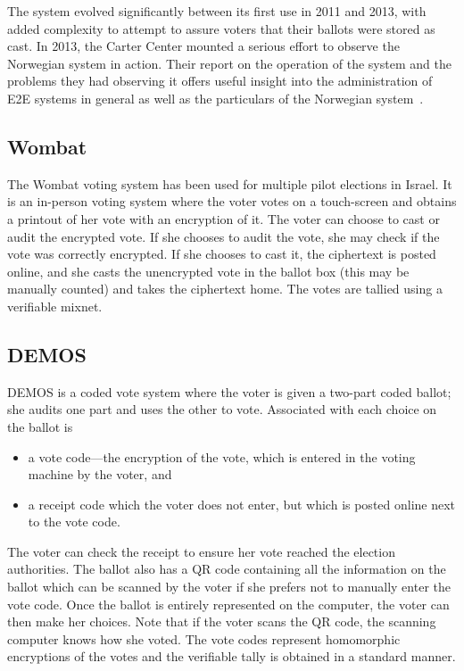 The system evolved significantly between its first use in 2011 and
2013, with added complexity to attempt to assure voters that their
ballots were stored as cast. In 2013, the Carter Center mounted a
serious effort to observe the Norwegian system in action. Their
report on the operation of the system and the problems
they had observing it offers useful insight into the administration of
E2E systems in general as well as the particulars of the Norwegian
system~\cite{carter2013}.

\subsection{Wombat~\cite{rosen2011}}

The Wombat voting system has been used for multiple pilot elections in
Israel. It is an in-person voting system where the voter votes on a
touch-screen and obtains a printout of her vote with an encryption of
it. The voter can choose to cast or audit the encrypted vote. If she
chooses to audit the vote, she may check if the vote was correctly
encrypted. If she chooses to cast it, the ciphertext is posted online,
and she casts the unencrypted vote in the ballot box (this may be
manually counted) and takes the ciphertext home. The votes are tallied
using a verifiable mixnet.

\subsection{DEMOS~\cite{kiayias2014}}

DEMOS is a coded vote system where the voter is given a two-part coded
ballot; she audits one part and uses the other to vote. Associated
with each choice on the ballot is

\begin{itemize}
\item a vote code---the encryption of the vote, which is entered in
  the voting machine by the voter, and
\item a receipt code which the voter does not enter, but which is
  posted online next to the vote code.
\end{itemize}

The voter can check the receipt to ensure her vote reached the
election authorities. The ballot also has a QR code containing all the
information on the ballot which can be scanned by the voter if she
prefers not to manually enter the vote code. Once the ballot is
entirely represented on the computer, the voter can then make her
choices. Note that if the voter scans the QR code, the scanning
computer knows how she voted. The vote codes represent homomorphic
encryptions of the votes and the verifiable tally is obtained in a
standard manner.

